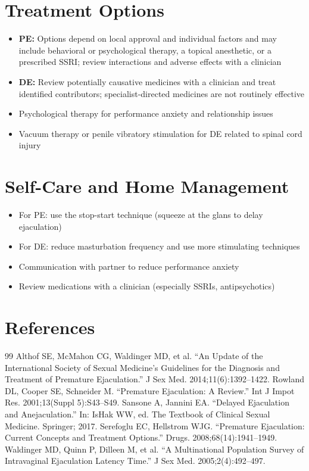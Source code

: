 \section*{Treatment Options}
\begin{itemize}
  \item \textbf{PE:} Options depend on local approval and individual factors and may include behavioral or psychological therapy, a topical anesthetic, or a prescribed SSRI; review interactions and adverse effects with a clinician
  \item \textbf{DE:} Review potentially causative medicines with a clinician and treat identified contributors; specialist-directed medicines are not routinely effective
  \item Psychological therapy for performance anxiety and relationship issues
  \item Vacuum therapy or penile vibratory stimulation for DE related to spinal cord injury
\end{itemize}

\section*{Self-Care and Home Management}
\begin{itemize}
  \item For PE: use the stop-start technique (squeeze at the glans to delay ejaculation)
  \item For DE: reduce masturbation frequency and use more stimulating techniques
  \item Communication with partner to reduce performance anxiety
  \item Review medications with a clinician (especially SSRIs, antipsychotics)
\end{itemize}

\section*{References}
\begin{thebibliography}{99}
 Althof SE, McMahon CG, Waldinger MD, et al. ``An Update of the International Society of Sexual Medicine's Guidelines for the Diagnosis and Treatment of Premature Ejaculation.'' J Sex Med. 2014;11(6):1392--1422.
 Rowland DL, Cooper SE, Schneider M. ``Premature Ejaculation: A Review.'' Int J Impot Res. 2001;13(Suppl 5):S43--S49.
 Sansone A, Jannini EA. ``Delayed Ejaculation and Anejaculation.'' In: IsHak WW, ed. The Textbook of Clinical Sexual Medicine. Springer; 2017.
 Serefoglu EC, Hellstrom WJG. ``Premature Ejaculation: Current Concepts and Treatment Options.'' Drugs. 2008;68(14):1941--1949.
 Waldinger MD, Quinn P, Dilleen M, et al. ``A Multinational Population Survey of Intravaginal Ejaculation Latency Time.'' J Sex Med. 2005;2(4):492--497.
\end{thebibliography}
